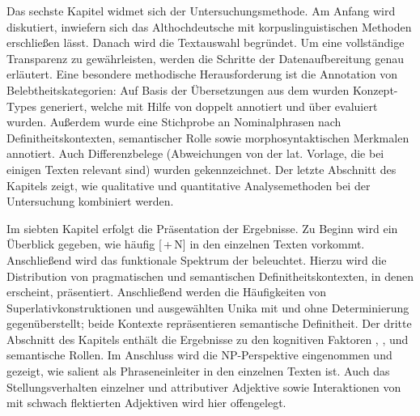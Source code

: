 Das sechste Kapitel widmet sich der Untersuchungsmethode. Am Anfang wird diskutiert, inwiefern sich das Althochdeutsche mit korpuslinguistischen Methoden  erschließen lässt. Danach wird die Textauswahl begründet. Um eine vollständige Transparenz zu gewährleisten, werden die Schritte der Datenaufbereitung genau erläutert. Eine besondere methodische Herausforderung ist die Anno\-ta\-tion  von Belebtheitskategorien:  Auf Basis der Übersetzungen aus dem  wurden Konzept-Types generiert, welche mit Hilfe von  doppelt annotiert  und über   evaluiert wurden. Außerdem wurde eine Stichprobe an Nominalphrasen  nach Definitheitskontexten, semantischer Rolle  sowie morphosyntaktischen Merkmalen  annotiert. Auch Differenzbelege  (Abweichungen von der lat. Vorlage, die bei einigen Texten relevant sind) wurden gekennzeichnet. Der letzte Abschnitt des Kapitels zeigt, wie qualitative und quantitative Analysemethoden bei der Untersuchung kombiniert werden. 
  
Im siebten Kapitel erfolgt die Präsentation der Ergebnisse. Zu Beginn wird ein Überblick gegeben, wie häufig [\,+\,N] in den einzelnen Texten vorkommt. Anschließend wird das funktionale Spektrum der  beleuchtet. Hierzu wird die Distribution von pragmatischen  und semantischen Definitheitskontexten,  in denen  erscheint, präsentiert. Anschließend werden die Häufigkeiten von Superlativkonstruktionen  und ausgewählten Unika  mit und ohne Determinierung gegenüberstellt; beide Kontexte repräsentieren semantische Definitheit.  Der dritte Abschnitt des Kapitels enthält die Ergebnisse zu den kognitiven Faktoren , ,  und semantische Rollen. Im Anschluss wird die NP-Perspektive  eingenommen und gezeigt, wie salient  als Phraseneinleiter  in den einzelnen Texten ist. Auch das  Stellungsverhalten  einzelner  und attributiver Adjektive  sowie Interaktionen von  mit schwach flektierten Adjektiven  wird hier offengelegt. 

